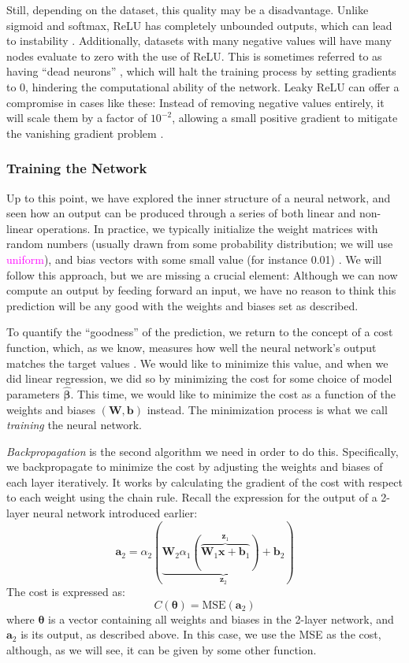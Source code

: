 Still, depending on the dataset, this quality may be a disadvantage. Unlike sigmoid and softmax, ReLU has completely unbounded outputs, which can lead to instability \cite{mediumReLU}. Additionally, datasets with many negative values will have many nodes evaluate to zero with the use of ReLU. This is sometimes referred to as having ``dead neurons'' \cite{mediumReLU}, which will halt the training process by setting gradients to 0, hindering the computational ability of the network. Leaky ReLU can offer a compromise in cases like these: Instead of removing negative values entirely, it will scale them by a factor of $10^{-2}$, allowing a small positive gradient to mitigate the vanishing gradient problem \cite{ReLU}.

\subsubsection{Training the Network}
Up to this point, we have explored the inner structure of a neural network, and seen how an output can be produced through a series of both linear and non-linear operations. In practice, we typically initialize the weight matrices with random numbers (usually drawn from some probability distribution; we will use \textcolor{magenta}{uniform}), and bias vectors with some small value (for instance 0.01) \cite{MHJweek42}. We will follow this approach, but we are missing a crucial element: Although we can now compute an output by feeding forward an input, we have no reason to think this prediction will be any good with the weights and biases set as described. 

To quantify the ``goodness'' of the prediction, we return to the concept of a cost function, which, as we know, measures how well the neural network's output matches the target values \cite{fysstkproject1}. We would like to minimize this value, and when we did linear regression, we did so by minimizing the cost for some choice of model parameters $\boldsymbol{\hat{\beta}}$. This time, we would like to minimize the cost as a function of the weights and biases $(\mathbf{W}, \boldsymbol b)$ instead. The minimization process is what we call \emph{training} the neural network. 

\emph{Backpropagation} is the second algorithm we need in order to do this. Specifically, we backpropagate to minimize the cost by adjusting the weights and biases of each layer iteratively. It works by calculating the gradient of the cost with respect to each weight using the chain rule. Recall the expression for the output of a 2-layer neural network introduced earlier:
\[\boldsymbol{a}_2 = \alpha_2(\underbrace{\mathbf W_2 \alpha_1(\overbrace{\mathbf W_1 \boldsymbol{x} + \boldsymbol b_1}^{\boldsymbol z_1})  + \boldsymbol b_2}_{\boldsymbol z_2})\]
The cost is expressed as:
\[C(\boldsymbol{\theta}) = \text{MSE}(\boldsymbol a_2)\]
where $\boldsymbol{\theta}$ is a vector containing all weights and biases in the 2-layer network, and $\boldsymbol a_2$ is its output, as described above. In this case, we use the MSE as the cost, although, as we will see, it can be given by some other function. 

